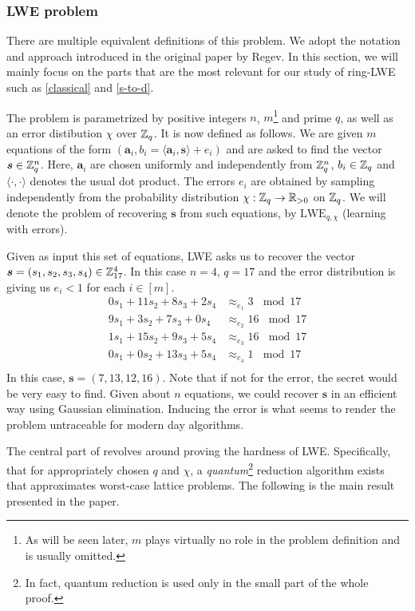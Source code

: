 \subsubsection*{LWE problem}
There are multiple equivalent definitions of this problem. We adopt the notation and approach introduced in the original paper by Regev. In this section, we will mainly focus on the parts that are the most relevant for our study of ring-LWE such as \ref{classical} and \ref{s-to-d}. 

The problem is parametrized by positive integers $n$, $m$\footnote{As will be seen later, $m$ plays virtually no role in the problem definition and is usually omitted.} and prime $q$, as well as an error distibution $\chi$ over $\mathbb{Z}_q$. It is now defined as follows. We are given $m$ equations of the form $(\bm{a}_i, b_i = \langle \bm{a}_i, \bm{s} \rangle + e_i)$ and are asked to find the vector $\boldsymbol{s} \in \mathbb{Z}_q^n$. Here, $\bm{a}_i$ are chosen uniformly and independently from $\mathbb{Z}_q^n$, $b_i \in \mathbb{Z}_q$ and $\langle \cdot, \cdot \rangle$ denotes the usual dot product. The errors $e_i$ are obtained by sampling independently from the probability distribution $\chi : \mathbb{Z}_q \rightarrow \mathbb{R}_{> 0}$ on $\mathbb{Z}_q$. We will denote the problem of recovering $\bm{s}$ from such equations, by $\text{LWE}_{q, \chi}$ (learning with errors).

\begin{example}\label{lwe_ex}
        Given as input this set of equations, LWE asks us to recover the vector $\boldsymbol{s} = (s_1, s_2, s_3, s_4) \in \mathbb{Z}_{17}^4$. In this case $n = 4$, $q=17$ and the error distribution is giving us $e_i < 1$ for each $i \in [m]$. 
\begin{align*}
        0s_1 + 11s_2 +8s_3 + 2s_4 & \approx_{e_1} 3 \, \mod 17\\
        9s_1 +  3s_2 + 7s_3 + 0s_4 & \approx_{e_2} 16 \, \mod 17\\
        1s_1 +  15s_2 + 9s_3 + 5s_4 & \approx_{e_3} 16 \, \mod 17\\
        0s_1 +  0s_2 + 13s_3 + 5s_4 & \approx_{e_4} 1 \, \mod 17\\
\end{align*}
In this case, $\bm{s} = (7, 13, 12, 16)$. Note that if not for the error, the secret would be very easy to find. Given about $n$ equations, we could recover $\bm{s}$ in an efficient way using Gaussian elimination. Inducing the error is what seems to render the problem untraceable for modern day algorithms.
\end{example}
The central part of \cite{regev} revolves around proving the hardness of LWE. Specifically, that for appropriately chosen $q$ and $\chi$, a \textit{quantum}\footnote{In fact, quantum reduction is used only in the small part of the whole proof.} reduction algorithm exists that approximates worst-case lattice problems. The following is the main result presented in the paper. 

